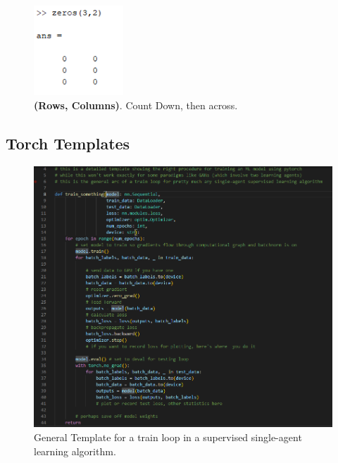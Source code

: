 \documentclass[12pt]{article}
\begin{document}
\begin{figure}[H]
    \centering
    \includegraphics[width=0.3\textwidth]{./RowsColumnsCount.png} %
	\caption{\textbf{(Rows, Columns)}. Count Down, then across.}
\end{figure}

\subsection{Torch Templates}
\begin{figure}[H]
    \centering
    \includegraphics[width=1.0\textwidth]{./train_template_torch.png} %
	\caption{General Template for a train loop in a supervised single-agent learning algorithm.}
\end{figure}
\end{document}
